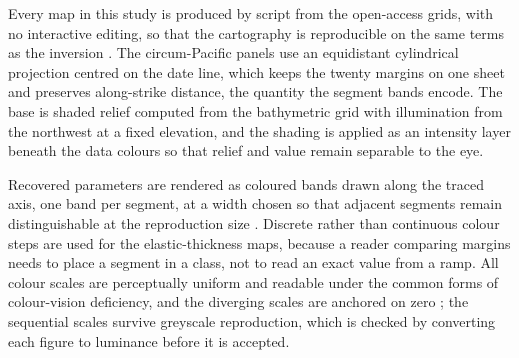\documentclass[final]{agujournal2019}
\begin{document}
Every map in this study is produced by script from the open-access grids, with
no interactive editing, so that the cartography is reproducible on the same
terms as the inversion \cite{Wessel2019,Piskarev2019Lomonosov,Lemenkova202213}. The circum-Pacific
panels use an equidistant cylindrical projection centred on the date line, which
keeps the twenty margins on one sheet and preserves along-strike distance, the
quantity the segment bands encode. The base is shaded relief computed from the
bathymetric grid with illumination from the northwest at a fixed elevation, and
the shading is applied as an intensity layer beneath the data colours so that
relief and value remain separable to the eye.

Recovered parameters are rendered as coloured bands drawn along the traced axis,
one band per segment, at a width chosen so that adjacent segments remain
distinguishable at the reproduction size \cite{Lemenkova202017}. Discrete rather than continuous colour
steps are used for the elastic-thickness maps, because a reader comparing
margins needs to place a segment in a class, not to read an exact value from a
ramp. All colour scales are perceptually uniform and readable under the
common forms of colour-vision deficiency, and the diverging scales are anchored
on zero \cite{Crameri2020}; the sequential scales survive greyscale
reproduction, which is checked by converting each figure to luminance before it
is accepted.
\end{document}
